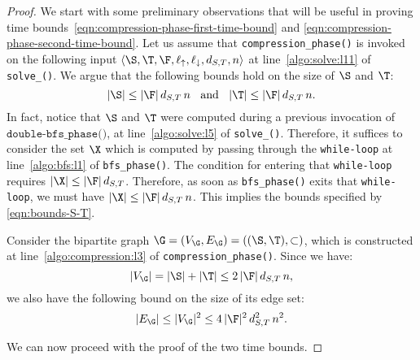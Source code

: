 \begin{proof}
We start with some preliminary observations that will be useful in proving time
bounds~\eqref{eqn:compression-phase-first-time-bound} and \eqref{eqn:compression-phase-second-time-bound}.
Let us assume that \texttt{compression\_phase()} is
invoked on the following input $\langle \S, \T, \F, \ell_\uparrow, \ell_\downarrow, d_{S,T}, n \rangle$
at line~\ref{algo:solve:l11} of \texttt{solve\_\mainproblem()}.
We argue that the following bounds hold on the size of $\S$ and $\T$:
\begin{equation}\label{eqn:bounds-S-T}
|\S|\leq |\F|\, d_{S,T}\, n \;\;\text{ and }\;\; |\T|\leq |\F|\, d_{S,T}\, n.
\end{equation}
In fact, notice that $\S$ and $\T$ were computed during a previous invocation of $\texttt{double-bfs\_phase()}$,
at line~\ref{algo:solve:l5} of \texttt{solve\_\mainproblem()}.
Therefore, it suffices to consider the set $\X$ which is computed by passing through the
\texttt{while-loop} at line~\ref{algo:bfs:l1} of \texttt{bfs\_phase()}.
The condition for entering that \texttt{while-loop} requires $|\X|\leq |\F|\, d_{S,T}$.
Therefore, as soon as \texttt{bfs\_phase()} exits that \texttt{while-loop}, we must have $|\X|\leq |\F|\, d_{S,T}\, n$.
This implies the bounds specified by \eqref{eqn:bounds-S-T}.

Consider the bipartite graph $\G=(V_\G, E_\G)=((\S, \T), \subset)$, which is constructed
at line~\ref{algo:compression:l3} of \texttt{compression\_phase()}.
Since we have:
\[|V_\G| = |\S| + |\T| \leq 2\,|\F|\, d_{S,T}\, n,\]
we also have the following bound on the size of its edge set:
\[|E_\G| \leq |V_\G|^2 \leq 4\,|\F|^2\, d^2_{S,T}\, n^2. \]

We can now proceed with the proof of the two time bounds.


\end{proof}
